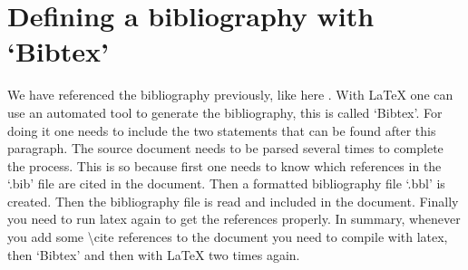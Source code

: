 \documentclass[a4paper]{article}
\begin{document}
\section{Defining a bibliography with `Bibtex'}

We have referenced the bibliography previously, like here \cite{Stone1932}. With \LaTeX{} one can use an automated tool to generate the bibliography, this is called `Bibtex'.  For doing it one needs to include the two statements that can be found after this paragraph. The source document needs to be parsed several times to complete the process. This is so because first one needs to know which references in the `.bib' file are cited in the document. Then a formatted bibliography file `.bbl' is created. Then the bibliography file is read and included in the document. Finally you need to run latex again to get the references properly. In summary, whenever you add some \textbackslash{}cite references to the document you need to compile with latex, then `Bibtex' and then with \LaTeX{} two times again. 




\end{document}
